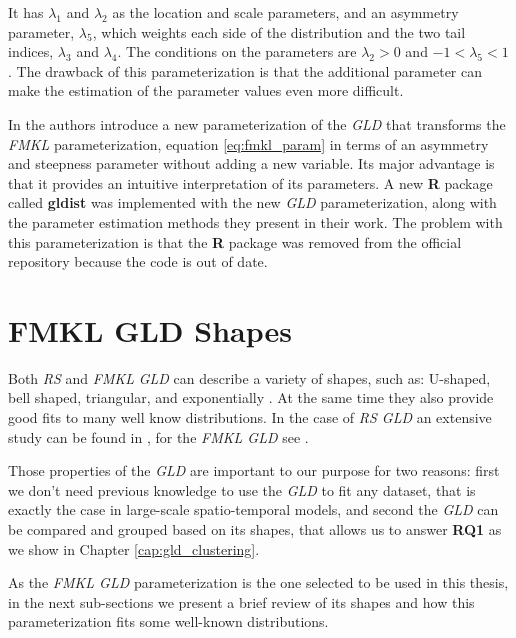 It has $\lambda_{1}$ and $\lambda_{2}$ as the location and scale parameters, and an asymmetry parameter, $\lambda_{5}$, which weights each side of the distribution and the two tail indices, $\lambda_{3}$ and $\lambda_{4}$. The conditions on the parameters are $\lambda_{2} > 0$ and $-1 < \lambda_{5} < 1$. The drawback of this parameterization is that the additional parameter can make the estimation of the parameter values even more difficult.

In \cite{Chalabi2012} the authors introduce a new parameterization of the \textit{GLD} that transforms the \textit{FMKL} parameterization, equation \ref{eq:fmkl_param} in terms of an asymmetry and steepness parameter without adding a new variable. Its major advantage is that it provides an intuitive interpretation of its parameters. A new \textbf{R} package called \textbf{gldist} was implemented with the new \textit{GLD} parameterization, along with the parameter estimation methods they present in their work. The problem with this parameterization is  that the \textbf{R} package was removed from the official repository because the code is out of date.

\section{FMKL GLD Shapes}\label{sec:gld_shapes}
Both \textit{RS} and \textit{FMKL} \textit{GLD} can describe a variety of shapes, such as: U-shaped, bell shaped, triangular, and exponentially \cite{Su2007}. At the same time they also provide good fits to many well know distributions. In the case of \textit{RS GLD} an extensive study can be found in \cite{Karian2011}, for the \textit{FMKL GLD} see \cite{Freimer1988}. 

Those properties of the \textit{GLD} are important to our purpose for two reasons: first we don't need previous knowledge to use the \textit{GLD} to fit any dataset, that is exactly the case in large-scale spatio-temporal models, and second the \textit{GLD} can be compared and grouped based on its shapes, that allows us to answer \textbf{RQ1} as we show in Chapter \ref{cap:gld_clustering}.

As the \textit{FMKL GLD} parameterization is the one selected to be used in this thesis, in the next sub-sections we present a brief review of its shapes and how this parameterization fits some well-known distributions.

